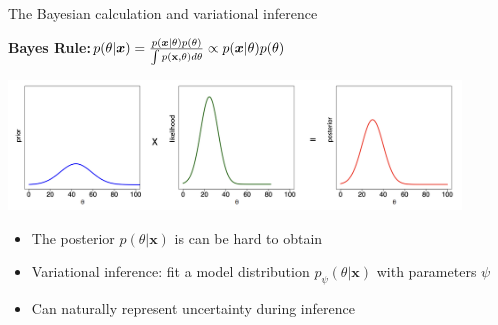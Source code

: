\documentclass{beamer}					%
\begin{document}
\begin{frame}{The Bayesian calculation and variational inference}


\textbf{Bayes Rule:}\;\;$p(\theta\lvert \boldsymbol{x}) = \frac{p(\boldsymbol{x}\lvert \theta)p(\theta)}{\int p(\bold{x},\theta)d\theta} \propto p(\boldsymbol{x}\lvert \theta)p(\theta)$
\vspace{0.75cm}

\includegraphics[width=12cm]{../../dissertation/dissertation/media/BayesRule.png}
\vspace{0.5cm}

\begin{itemize}
\item The posterior $p(\theta\lvert \boldsymbol{x})$ is can be hard to obtain
\item Variational inference: fit a model distribution $p_{\psi}(\theta\lvert \boldsymbol{x})$ with parameters $\psi$
\item Can naturally represent uncertainty during inference
\end{itemize}

\end{frame}


\end{document}
